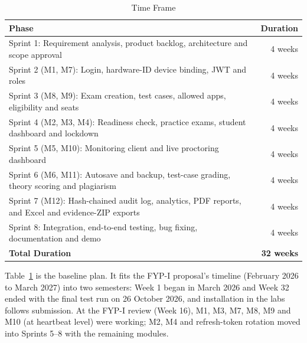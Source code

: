 \begin{table}[H]
\centering
\caption{Time Frame}
\label{tab:timeframe}
\renewcommand{\arraystretch}{1.2}
\begin{tabularx}{\linewidth}{>{\raggedright\arraybackslash}Xr}
\hline\hline
\textbf{Phase} & \textbf{Duration} \\
\hline
Sprint 1: Requirement analysis, product backlog, architecture and scope approval & 4 weeks \\
Sprint 2 (M1, M7): Login, hardware-ID device binding, JWT and roles & 4 weeks \\
Sprint 3 (M8, M9): Exam creation, test cases, allowed apps, eligibility and seats & 4 weeks \\
Sprint 4 (M2, M3, M4): Readiness check, practice exams, student dashboard and lockdown & 4 weeks \\
Sprint 5 (M5, M10): Monitoring client and live proctoring dashboard & 4 weeks \\
Sprint 6 (M6, M11): Autosave and backup, test-case grading, theory scoring and plagiarism & 4 weeks \\
Sprint 7 (M12): Hash-chained audit log, analytics, PDF reports, and Excel and evidence-ZIP exports & 4 weeks \\
Sprint 8: Integration, end-to-end testing, bug fixing, documentation and demo & 4 weeks \\
\hline
\textbf{Total Duration} & \textbf{32 weeks} \\
\hline\hline
\end{tabularx}
\end{table}

Table~\ref{tab:timeframe} is the baseline plan. It fits the FYP-I proposal's timeline (February 2026 to March 2027) into two semesters: Week 1 began in March 2026 and Week 32 ended with the final test run on 26 October 2026, and installation in the labs follows submission. At the FYP-I review (Week 16), M1, M3, M7, M8, M9 and M10 (at heartbeat level) were working; M2, M4 and refresh-token rotation moved into Sprints 5--8 with the remaining modules.

